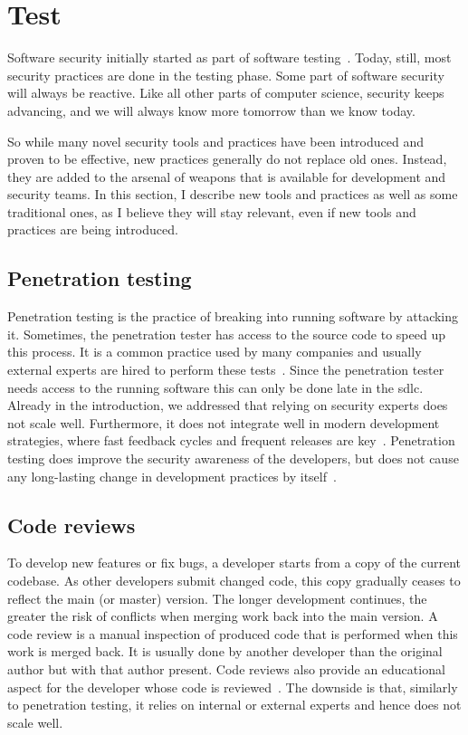\section{Test}
\label{sec:related-test}

Software security initially started as part of software testing~\cite{sharma2017}.
Today, still, most security practices are done in the testing phase.
Some part of software security will always be reactive.
Like all other parts of computer science, security keeps advancing, and we will always know more tomorrow than we know today.

So while many novel security tools and practices have been introduced and proven to be effective, new practices generally do not replace old ones.
Instead, they are added to the arsenal of weapons that is available for development and security teams.
In this section, I describe new tools and practices as well as some traditional ones, as I believe they will stay relevant, even if new tools and practices are being introduced.

\subsection{Penetration testing}
Penetration testing is the practice of breaking into running software by attacking it.
Sometimes, the penetration tester has access to the source code to speed up this process.
It is a common practice used by many companies and usually external experts are hired to perform these tests~\cite{cruzes2017security,bsimm11}.
Since the penetration tester needs access to the running software this can only be done late in the \gls{sdlc}.
Already in the introduction, we addressed that relying on security experts does not scale well.
Furthermore, it does not integrate well in modern development strategies, where fast feedback cycles and frequent releases are key~\cite{securitytestingagile}.
Penetration testing does improve the security awareness of the developers, but does not cause any long-lasting change in development practices by itself~\cite{turpe2016penetration}.

\subsection{Code reviews}
To develop new features or fix bugs, a developer starts from a copy of the current codebase.
As other developers submit changed code, this copy gradually ceases to reflect the main (or master) version.
The longer development continues, the greater the risk of conflicts when merging work back into the main version.
A code review is a manual inspection of produced code that is performed when this work is merged back.
It is usually done by another developer than the original author but with that author present.
Code reviews also provide an educational aspect for the developer whose code is reviewed~\cite{futcher2008guidelines}.
The downside is that, similarly to penetration testing, it relies on internal or external experts and hence does not scale well.

